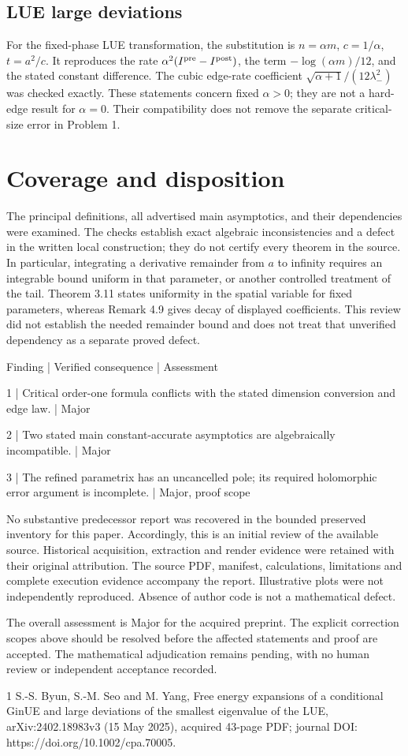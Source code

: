 \documentclass[10pt]{article}
\begin{document}
\subsection*{LUE large deviations}
For the fixed-phase LUE transformation, the substitution is \(n=\alpha m\), \(c=1/\alpha\), \(t=a^2/c\). It reproduces the rate \(\alpha^2(I^{\rm pre}-I^{\rm post})\), the term \(-\log(\alpha m)/12\), and the stated constant difference. The cubic edge-rate coefficient \(\sqrt{\alpha+1}/(12\lambda_-^2)\) was checked exactly. These statements concern fixed \(\alpha>0\); they are not a hard-edge result for \(\alpha=0\). Their compatibility does not remove the separate critical-size error in Problem 1.\par
\section*{Coverage and disposition}
The principal definitions, all advertised main asymptotics, and their dependencies were examined. The checks establish exact algebraic inconsistencies and a defect in the written local construction; they do not certify every theorem in the source. In particular, integrating a derivative remainder from \(a\) to infinity requires an integrable bound uniform in that parameter, or another controlled treatment of the tail. Theorem 3.11 states uniformity in the spatial variable for fixed parameters, whereas Remark 4.9 gives decay of displayed coefficients. This review did not establish the needed remainder bound and does not treat that unverified dependency as a separate proved defect.\par
Finding | Verified consequence | Assessment\par
1 | Critical order-one formula conflicts with the stated dimension conversion and edge law. | Major\par
2 | Two stated main constant-accurate asymptotics are algebraically incompatible. | Major\par
3 | The refined parametrix has an uncancelled pole; its required holomorphic error argument is incomplete. | Major, proof scope\par
No substantive predecessor report was recovered in the bounded preserved inventory for this paper. Accordingly, this is an initial review of the available source. Historical acquisition, extraction and render evidence were retained with their original attribution. The source PDF, manifest, calculations, limitations and complete execution evidence accompany the report. Illustrative plots were not independently reproduced. Absence of author code is not a mathematical defect.\par
The overall assessment is Major for the acquired preprint. The explicit correction scopes above should be resolved before the affected statements and proof are accepted. The mathematical adjudication remains pending, with no human review or independent acceptance recorded.\par
1 S.-S. Byun, S.-M. Seo and M. Yang, Free energy expansions of a conditional GinUE and large deviations of the smallest eigenvalue of the LUE, arXiv:2402.18983v3 (15 May 2025), acquired 43-page PDF; journal DOI: https://doi.org/10.1002/cpa.70005.\par
\end{document}
